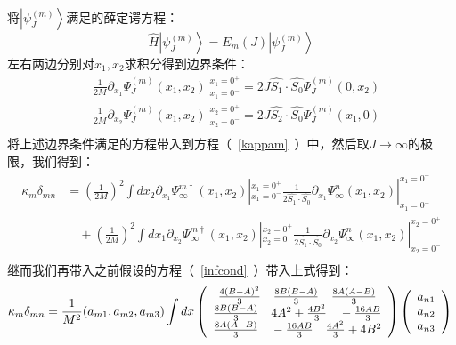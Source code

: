 将$\left|\psi^{(m)}_J\right>$满足的薛定谔方程：
\begin{equation}
\hat{H} \left|\psi^{(m)}_J\right> = E_m(J)\left|\psi^{(m)}_J\right>
\end{equation}
左右两边分别对$x_1,x_2$求积分得到边界条件：
    \begin{equation}
        \begin{split}
            &\frac{1}{2M}\partial_{x_1} \Psi^{(m)}_J(x_1,x_2)|_{x_1=0^-}^{x_1=0^+}= 2J \hat{S_1}\cdot \hat{S_0}\Psi^{(m)}_J(0,x_2) \\
            &\frac{1}{2M}\partial_{x_2} \Psi^{(m)}_J(x_1,x_2)|_{x_2=0^-}^{x_2=0^+}= 2J \hat{S_2}\cdot \hat{S_0} \Psi^{(m)}_J(x_1,0)\\
        \end{split}
    \end{equation}
将上述边界条件满足的方程带入到方程（~\ref{kappam}~）中，然后取$J\to\infty$的极限，我们得到：
\begin{equation}\label{kappammid}
    \begin{split}
            \kappa_m \delta_{mn} &=  (\frac{1}{2M})^2 \int dx_2 \partial_{x_1} \Psi^{m\dagger}_{\infty}(x_1,x_2) |^{x_1=0^+}_{x_1 = 0^-} \frac{1}{2\hat{S_1}\cdot \hat{S_0}} \partial_{x_1} \Psi^{n}_{\infty}(x_1,x_2) |^{x_1=0^+}_{x_1 = 0^-}\\
            & \quad +  (\frac{1}{2M})^2 \int dx_1 \partial_{x_2} \Psi^{m\dagger}_{\infty}(x_1,x_2) |^{x_2=0^+}_{x_2 = 0^-} \frac{1}{2\hat{S_1}\cdot \hat{S_0}} \partial_{x_2} \Psi^{n}_{\infty}(x_1,x_2) |^{x_2=0^+}_{x_2 = 0^-}\\
    \end{split}
\end{equation} 
继而我们再带入之前假设的方程（~\ref{infcond}~）带入上式得到：
\begin{equation}
           \kappa_m \delta_{mn} = \frac{1}{M^2}(a_{m1},a_{m2},a_{m3}) \int dx
            \left(
            \begin{array}{c}
                \frac{4(B-A)^2}{3} \quad \frac{8B(B-A)}{3}  \quad \frac{8A(A-B)}{3}\\
                \frac{8B(B-A)}{3} \quad 4 A^2+\frac{4 B^2}{3}  \quad -\frac{16AB}{3} \\
                \frac{8A(A-B)}{3} \quad  -\frac{16AB}{3} \quad \frac{4 A^2}{3}+4 B^2
            \end{array}
            \right) 
            \left(
            \begin{array}{c}
                a_{n1}\\
                a_{n2}\\
                a_{n3}\\
            \end{array}
            \right)\\
\end{equation}
